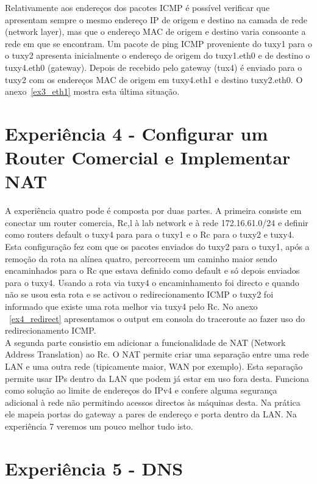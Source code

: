 \documentclass[11pt,a4paper,reqno]{report}
\numberwithin{equation}{section}
\begin{document}
Relativamente aos endereços dos pacotes ICMP é possível verificar que apresentam sempre o mesmo endereço IP de origem e destino na camada de rede (network layer), mas que o endereço MAC de origem e destino varia consoante a rede em que se encontram. Um pacote de ping ICMP proveniente do tuxy1 para o o tuxy2 apresenta inicialmente o endereço de origem do tuxy1.eth0 e de destino o tuxy4.eth0 (gateway). Depois de recebido pelo gateway (tux4) é enviado para o tuxy2 com os endereços MAC de origem em tuxy4.eth1 e destino tuxy2.eth0. O anexo~\ref{ex3_eth1} mostra esta última situação.



\section{Experiência 4 - Configurar um Router Comercial e Implementar NAT}
A experiência quatro pode é composta por duas partes. A primeira consiste em conectar um router comercia, Rc,l à lab network e à rede 172.16.61.0/24 e definir como routers default o tuxy4 para para o tuxy1 e o Rc para o tuxy2 e tuxy4.
Esta configuração fez com que os pacotes enviados do tuxy2 para o tuxy1, após a remoção da rota na alínea quatro, percorrecem um caminho maior sendo encaminhados para o Rc que estava definido como default e só depois enviados para o tuxy4. Usando a rota via tuxy4 o encaminhamento foi directo e quando não se usou esta rota e se activou o redirecionamento ICMP o tuxy2 foi informado que existe uma rota melhor via tuxy4 pelo Rc. No anexo ~\ref{ex4_redirect} apresentamos o output em consola do traceroute ao fazer uso do redirecionamento ICMP.\\

A segunda parte consistio em adicionar a funcionalidade de NAT (Network Address Translation) ao Rc.
O NAT permite criar uma separação entre uma rede LAN e uma outra rede (tipicamente maior, WAN por exemplo). Esta separação permite usar IPs dentro da LAN que podem já estar em uso fora desta. Funciona como solução ao limite de endereços do IPv4 e confere alguma segurança adicional à rede não permitindo acessos directos às máquinas desta. Na prática ele mapeia portas do gateway a pares de endereço e porta dentro da LAN. Na experiência 7 veremos um pouco melhor tudo isto.\\

\section{Experiência 5 - DNS}
\end{document}
